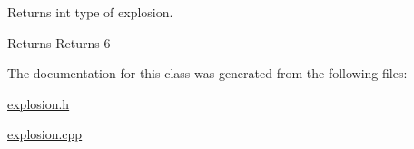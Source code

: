 Returns int type of explosion. 

\begin{DoxyReturn}{Returns}
Returns 6 
\end{DoxyReturn}


The documentation for this class was generated from the following files\-:\begin{DoxyCompactItemize}
\item 
\hyperlink{explosion_8h}{explosion.\-h}\item 
\hyperlink{explosion_8cpp}{explosion.\-cpp}\end{DoxyCompactItemize}
